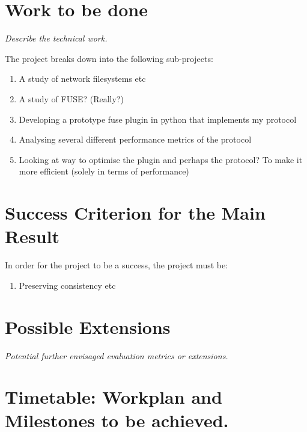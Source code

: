 \section*{Work to be done}

{\em Describe the technical work.}

The project breaks down into the following sub-projects:

\begin{enumerate}

\item A study of network filesystems etc

\item A study of FUSE? (Really?)

\item Developing a prototype fuse plugin in python that implements my protocol

\item Analysing several different performance metrics of the protocol

\item Looking at way to optimise the plugin and perhaps the protocol? To make it more efficient
(solely in terms of performance)

\end{enumerate}

\section*{Success Criterion for the Main Result}


In order for the project to be a success, the project must be:
\begin{enumerate}

\item Preserving consistency etc

\end{enumerate}




\section*{Possible Extensions}

{\em Potential further envisaged evaluation metrics or extensions.}



\section*{Timetable: Workplan and Milestones to be achieved.}


